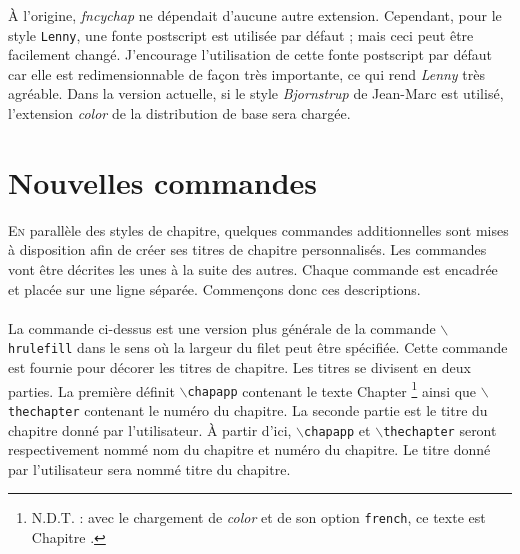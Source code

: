 \documentclass{report}
\newcommand{\sk}{\vspace{0.2 cm}}
\newcommand{\A}[1]{{$\backslash${\tt #1}}}
\newcommand{\nsp}{\mbox{\hspace{-1 cm}}}
\begin{document}
    À l'origine, \textsl{fncychap} ne dépendait d'aucune autre extension. 
    Cependant, pour le style {\tt Lenny}, une fonte postscript est utilisée
    par défaut ; mais ceci peut être facilement changé. J'encourage 
    l'utilisation de cette fonte postscript par défaut car elle est 
    redimensionnable de façon très importante, ce qui rend \emph{Lenny} 
    très agréable. Dans la version actuelle, si le style \textsl{Bjornstrup}
    de Jean-Marc est utilisé, l'extension \textsl{color} de la distribution de
    base sera chargée. 
    
  \chapter{Nouvelles commandes}
    \lettrine[findent=0.2em,nindent=0em,realheight=true]{E}{n} parallèle des 
    styles de chapitre, quelques commandes additionnelles sont mises à 
    disposition afin de créer ses titres de chapitre personnalisés.
    Les commandes vont être décrites les unes à la suite des autres. Chaque
    commande est encadrée et placée sur une ligne séparée. Commençons donc 
    ces descriptions.\sk\\
    \nsp\fbox{\A{mghrulefill}\{{\em largeur}\}}\sk\\
    La commande ci-dessus est une version plus générale de la commande
    \A{hrulefill} dans le sens où la largeur du filet peut être spécifiée.
    Cette commande est fournie pour décorer les titres de chapitre. Les
    titres se divisent en deux parties. La première définit \A{chapapp} 
    contenant le texte \og Chapter \fg{}\footnote{N.D.T. : avec le chargement
    de \textsl{color} et de son option \texttt{french}, ce texte est 
    \og Chapitre \fg{}.} ainsi que \A{thechapter} contenant le numéro du
    chapitre. La seconde partie est le titre du chapitre donné par 
    l'utilisateur. À partir d'ici, \A{chapapp} et \A{thechapter} seront
    respectivement nommé nom du chapitre et numéro du chapitre. Le titre
    donné par l'utilisateur sera nommé titre du chapitre.
\end{document}
